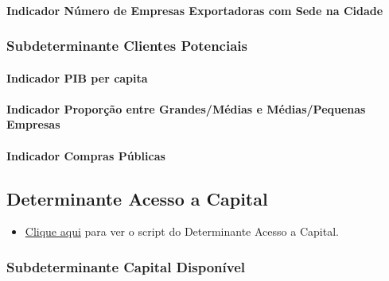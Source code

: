 \documentclass[
  12,
  dvipsnames]{article}
\providecommand{\tightlist}{%
  \setlength{\itemsep}{0pt}\setlength{\parskip}{0pt}}
\begin{document}
\hypertarget{indicador-nuxfamero-de-empresas-exportadoras-com-sede-na-cidade}{%
\paragraph{Indicador Número de Empresas Exportadoras com Sede na
Cidade}\label{indicador-nuxfamero-de-empresas-exportadoras-com-sede-na-cidade}}

\hypertarget{subdeterminante-clientes-potenciais}{%
\subsubsection{Subdeterminante Clientes
Potenciais}\label{subdeterminante-clientes-potenciais}}

\hypertarget{indicador-pib-per-capita}{%
\paragraph{Indicador PIB per capita}\label{indicador-pib-per-capita}}

\hypertarget{indicador-proporuxe7uxe3o-entre-grandesmuxe9dias-e-muxe9diaspequenas-empresas}{%
\paragraph{Indicador Proporção entre Grandes/Médias e Médias/Pequenas
Empresas}\label{indicador-proporuxe7uxe3o-entre-grandesmuxe9dias-e-muxe9diaspequenas-empresas}}

\hypertarget{indicador-compras-puxfablicas}{%
\paragraph{Indicador Compras
Públicas}\label{indicador-compras-puxfablicas}}

\hypertarget{det_acesso_capital}{%
\subsection{Determinante Acesso a Capital}\label{det_acesso_capital}}

\begin{itemize}
\tightlist
\item
  \protect\hyperlink{script_2.4}{Clique aqui} para ver o script do
  Determinante Acesso a Capital.
\end{itemize}

\hypertarget{subdet_cap_disp}{%
\subsubsection{Subdeterminante Capital
Disponível}\label{subdet_cap_disp}}
\end{document}

